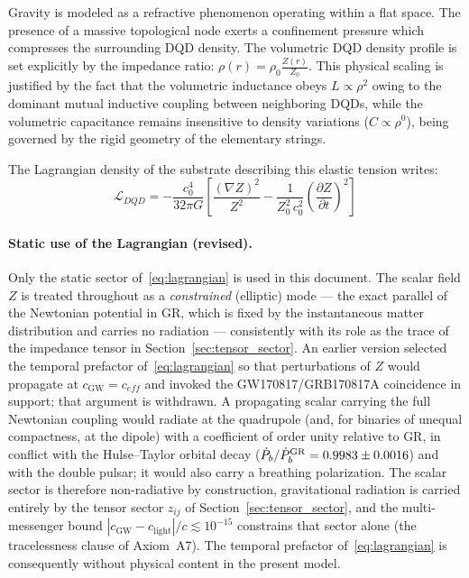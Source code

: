 \documentclass[11pt,a4paper]{article}
\theoremstyle{plain}
\theoremstyle{remark}
\begin{document}
Gravity is modeled as a refractive phenomenon operating within a flat space. The presence of a massive topological node exerts a confinement pressure which compresses the surrounding DQD density. The volumetric DQD density profile is set explicitly by the impedance ratio: $\rho(r) = \rho_0 \frac{Z(r)}{Z_0}$. This physical scaling is justified by the fact that the volumetric inductance obeys $L \propto \rho^2$ owing to the dominant mutual inductive coupling between neighboring DQDs, while the volumetric capacitance remains insensitive to density variations ($C \propto \rho^0$), being governed by the rigid geometry of the elementary strings.

The Lagrangian density of the substrate describing this elastic tension writes:
\begin{equation}\label{eq:lagrangian}
\mathcal{L}_{DQD} = - \frac{c_0^4}{32 \pi G} \left[ \frac{(\nabla Z)^2}{Z^2} - \frac{1}{Z_0^2\,c_0^2} \left( \frac{\partial Z}{\partial t} \right)^2 \right]
\end{equation}

\paragraph{Static use of the Lagrangian (revised).} Only the static sector of~\eqref{eq:lagrangian} is used in this document. The scalar field $Z$ is treated throughout as a \emph{constrained} (elliptic) mode --- the exact parallel of the Newtonian potential in GR, which is fixed by the instantaneous matter distribution and carries no radiation --- consistently with its role as the trace of the impedance tensor in Section~\ref{sec:tensor_sector}. An earlier version selected the temporal prefactor of~\eqref{eq:lagrangian} so that perturbations of $Z$ would propagate at $c_{\text{GW}} = c_{eff}$ and invoked the GW170817/GRB170817A coincidence in support; that argument is withdrawn. A propagating scalar carrying the full Newtonian coupling would radiate at the quadrupole (and, for binaries of unequal compactness, at the dipole) with a coefficient of order unity relative to GR, in conflict with the Hulse--Taylor orbital decay ($\dot P_b/\dot P_b^{\rm GR} = 0.9983 \pm 0.0016$) and with the double pulsar; it would also carry a breathing polarization. The scalar sector is therefore non-radiative by construction, gravitational radiation is carried entirely by the tensor sector $z_{ij}$ of Section~\ref{sec:tensor_sector}, and the multi-messenger bound $|c_{\text{GW}} - c_{\text{light}}|/c \lesssim 10^{-15}$ \cite{GW170817} constrains that sector alone (the tracelessness clause of Axiom~A7). The temporal prefactor of~\eqref{eq:lagrangian} is consequently without physical content in the present model.
\end{document}
